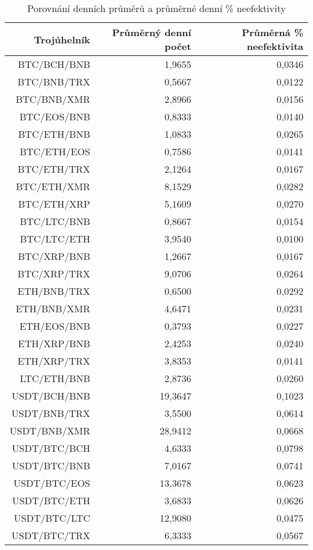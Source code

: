 \begin{table}\centering
\caption{Porovnání denních průměrů a průměrné denní \% neefektivity}
\label{table_averages}
\begin{tabular}{|| r | r | r ||}\hline Trojúhelník & Průměrný denní počet & Průměrná \% neefektivita\\
 \hline\hline BTC/BCH/BNB & 1,9655 & 0,0346\\ 
 \hline BTC/BNB/TRX & 0,5667 & 0,0122\\ 
 \hline BTC/BNB/XMR & 2,8966 & 0,0156\\ 
 \hline BTC/EOS/BNB & 0,8333 & 0,0140\\ 
 \hline BTC/ETH/BNB & 1,0833 & 0,0265\\ 
 \hline BTC/ETH/EOS & 0,7586 & 0,0141\\ 
 \hline BTC/ETH/TRX & 2,1264 & 0,0167\\ 
 \hline BTC/ETH/XMR & 8,1529 & 0,0282\\ 
 \hline BTC/ETH/XRP & 5,1609 & 0,0270\\ 
 \hline BTC/LTC/BNB & 0,8667 & 0,0154\\ 
 \hline BTC/LTC/ETH & 3,9540 & 0,0100\\ 
 \hline BTC/XRP/BNB & 1,2667 & 0,0167\\ 
 \hline BTC/XRP/TRX & 9,0706 & 0,0264\\ 
 \hline ETH/BNB/TRX & 0,6500 & 0,0292\\ 
 \hline ETH/BNB/XMR & 4,6471 & 0,0231\\ 
 \hline ETH/EOS/BNB & 0,3793 & 0,0227\\ 
 \hline ETH/XRP/BNB & 2,4253 & 0,0240\\ 
 \hline ETH/XRP/TRX & 3,8353 & 0,0141\\ 
 \hline LTC/ETH/BNB & 2,8736 & 0,0260\\ 
 \hline USDT/BCH/BNB & 19,3647 & 0,1023\\ 
 \hline USDT/BNB/TRX & 3,5500 & 0,0614\\ 
 \hline USDT/BNB/XMR & 28,9412 & 0,0668\\ 
 \hline USDT/BTC/BCH & 4,6333 & 0,0798\\ 
 \hline USDT/BTC/BNB & 7,0167 & 0,0741\\ 
 \hline USDT/BTC/EOS & 13,3678 & 0,0623\\ 
 \hline USDT/BTC/ETH & 3,6833 & 0,0626\\ 
 \hline USDT/BTC/LTC & 12,9080 & 0,0475\\ 
 \hline USDT/BTC/TRX & 6,3333 & 0,0567\\ 

\end{tabular}
\end{table}
